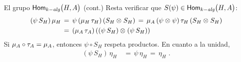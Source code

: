 \begin{frame}{El grupo $\Homalg\big(H,A\big)$ (cont.)}
	Resta verificar que $S(\psi)\in\Homalg\big(H,A\big)$:
	\begin{align*}
		(\psi\,S_H)\,\mu_H & \,=\,\psi\,(\mu_H\,\swap[H])\,
			(S_H\tensor S_H) \,=\,
			\mu_A\,(\psi\tensor\psi)\,\swap[H]\,(S_H\tensor S_H) \\
		& \,=\,(\mu_A\,\swap[A])\,((\psi\,S_H)\tensor (\psi\,S_H))
	\end{align*}
	Si $\mu_A\circ\swap[A]=\mu_A$, entonces $\psi\circ S_H$ respeta
	productos. En cuanto a la unidad,
	\begin{align*}
		(\psi\,S_H)\,\eta_H & \,=\,\psi\,\eta_H\,=\,\eta_H
		\text{ .}
	\end{align*}
\end{frame}

